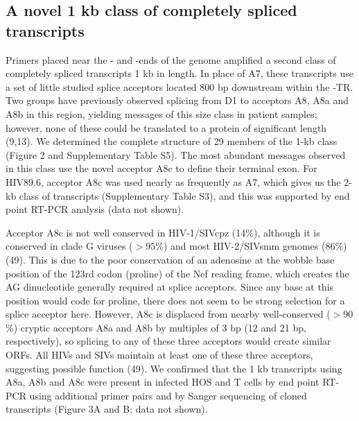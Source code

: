 \documentclass[../sherrill-Mix_thesis.tex]{subfiles}
\begin{document}
\subsection{A novel \approximately{}1 kb class of completely spliced transcripts}
Primers placed near the \fivePrime{}- and \threePrime{}-ends of the \hivEight{} genome amplified a second class of completely spliced transcripts \approximately{}1 kb in length. In place of A7, these transcripts use a set of little studied splice acceptors located \approximately{}800 bp downstream within the \threePrime{}-TR. Two groups have previously observed splicing from D1 to acceptors A8, A8a and A8b in this region, yielding messages of this size class in patient samples; however, none of these could be translated to a protein of significant length (9,13). We determined the complete structure of 29 members of the 1-kb class (Figure 2 and Supplementary Table S5). The most abundant messages observed in this class use the novel acceptor A8c to define their terminal exon. For HIV89.6, acceptor A8c was used nearly as frequently as A7, which gives us the 2-kb class of transcripts (Supplementary Table S3), and this was supported by end point RT-PCR analysis (data not shown).

Acceptor A8c is not well conserved in HIV-1/SIVcpz (14\%), although it is conserved in clade G viruses ($>95$\%) and most HIV-2/SIVsmm genomes (86\%) (49). This is due to the poor conservation of an adenosine at the wobble base position of the 123rd codon (proline) of the Nef reading frame, which creates the AG dinucleotide generally required at splice acceptors. Since any base at this position would code for proline, there does not seem to be strong selection for a splice acceptor here. However, A8c is displaced from nearby well-conserved ($>90$\%) cryptic acceptors A8a and A8b by multiples of 3 bp (12 and 21 bp, respectively), so splicing to any of these three acceptors would create similar ORFs. All HIVs and SIVs maintain at least one of these three acceptors, suggesting possible function (49). We confirmed that the 1 kb transcripts using A8a, A8b and A8c were present in infected HOS and T cells by end point RT-PCR using additional primer pairs and by Sanger sequencing of cloned transcripts (Figure 3A and B; data not shown). 
\end{document}
